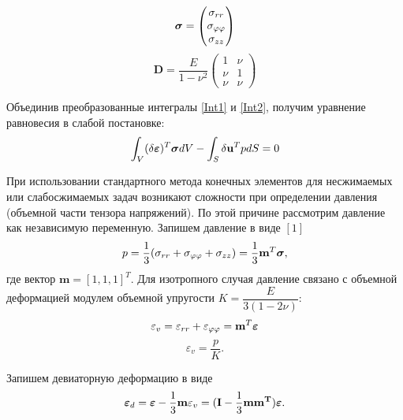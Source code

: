 \documentclass[a4paper,14pt]{extarticle}
\begin{document}
\begin{equation*}
\mbox{\boldmath$\sigma$}=
\begin{pmatrix}
\sigma_{rr} \\
\sigma_{\varphi \varphi} \\
\sigma_{zz}
\end{pmatrix}
\end{equation*}
\begin{equation*}
\mathbf{D}=\dfrac{E}{1-\nu^2}
\begin{pmatrix}
1 & \nu \\
\nu & 1  \\
\nu & \nu 
\end{pmatrix}
\end{equation*}

Объединив преобразованные интегралы \eqref{Int1} и \eqref{Int2}, получим уравнение равновесия в слабой постановке:
\begin{equation}\label{UrRavnF}
\int_{V} (\delta\mbox{\boldmath$\varepsilon$})^{T}\mbox{\boldmath$\sigma$}dV-\int_{S} \delta\mathbf{u}^T p dS=0
\end{equation}

При использовании стандартного метода конечных элементов для несжимаемых или слабосжимаемых задач возникают сложности при определении давления (объемной части тензора напряжений). По этой причине рассмотрим давление как независимую переменную. Запишем давление в виде $[1]$
\begin{equation*}
p=\dfrac{1}{3}(\sigma_{rr}+\sigma_{\varphi\varphi}+\sigma_{zz})=\dfrac{1}{3}\mathbf{m}^{T}\mbox{\boldmath$\sigma$},
\end{equation*}
где вектор $\mathbf{m}=[1,1,1]^T$. Для изотропного случая давление связано с объемной деформацией модулем объемной упругости $K=\dfrac{E}{3(1-2\nu)}$:
\begin{equation*}
\varepsilon_v=\varepsilon_{rr}+\varepsilon_{\varphi\varphi}=\mathbf{m}^{T} \mbox{\boldmath$\varepsilon$}
\end{equation*}
\begin{equation}\label{Weak}
\varepsilon_v=\dfrac{p}{K}.
\end{equation}

Запишем девиаторную деформацию в виде
\begin{equation*}
\mbox{\boldmath$\varepsilon$}_d=\mbox{\boldmath$\varepsilon$}-\dfrac{1}{3}\mathbf{m}\varepsilon_v=(\mathbf{I}-\dfrac{1}{3}\mathbf{mm^T})\mbox{\boldmath$\varepsilon$}.
\end{equation*}
\end{document}
